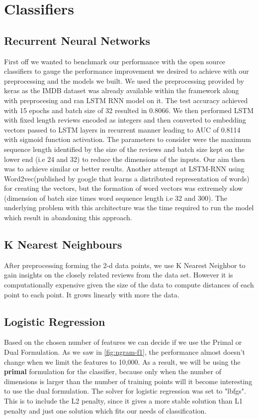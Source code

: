 \section{Classifiers}

\subsection{Recurrent Neural Networks}
First off we wanted to benchmark our performance with the open source classifiers to gauge the performance improvement we desired to achieve with our preprocessing and the models we built. We used the preprocessing provided by keras as the IMDB dataset was already available within the framework along with preprocesing and ran LSTM RNN model on it. The test accuracy achieved with 15 epochs and batch size of 32 resulted in 0.8066. We then performed LSTM with fixed length reviews encoded as integers and then converted to embedding vectors passed to LSTM layers in recurrent manner leading to AUC of 0.8114 with sigmoid function activation. The parameters to consider were the maximum sequence length identified by the size of the reviews and batch size kept on the lower end (i.e 24 and 32) to reduce the dimensions of the inputs. Our aim then was to achieve similar or better results. Another attempt at LSTM-RNN using Word2vec(published by google that learns a distributed representation of words) for creating the vectors, but the formation of word vectors was extremely slow (dimension of batch size times word sequence length i.e 32 and 300). The underlying problem with this architecture was the time required to run the model which result in abandoning this approach.  

\subsection{K Nearest Neighbours}
After preprocessing forming the 2-d data points, we use K Nearest Neighbor to gain insights on the closely related reviews from the data set. However it is computationally expensive given the size of the data to compute distances of each point to each point. It grows linearly with more the data.

\subsection{Logistic Regression}
Based on the chosen number of features we can decide if we use the Primal or Dual Formulation. As we saw in \ref{fig:ngram-f1}, the performance almost doesn't change when we limit the features to 10,000. As a result, we will be using the \textbf{primal} formulation for the classifier, because only when the number of dimensions is larger than the number of training points will it become interesting to use the dual formulation. The solver for logistic regression was set to "lbfgs". This is to include the L2 penalty, since it gives a more stable solution than L1 penalty and just one solution which fits our needs of classification.

